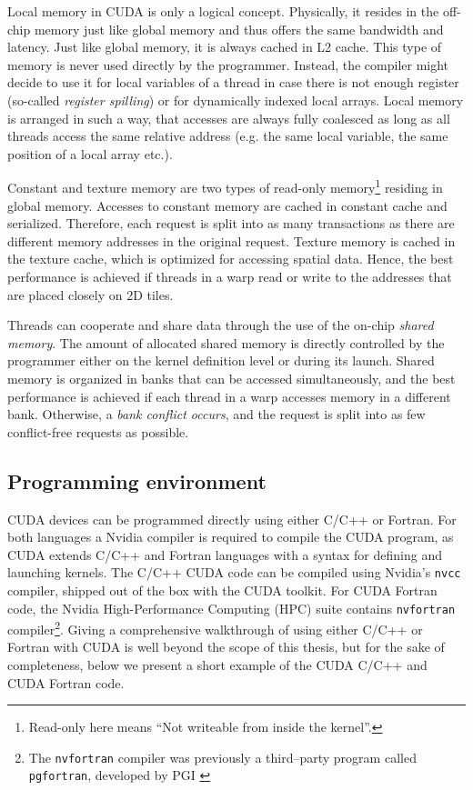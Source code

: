 Local memory in CUDA is only a logical concept. Physically, it resides in the
off-chip memory just like global memory and thus offers the same bandwidth and
latency. Just like global memory, it is always cached in L2 cache. This type of
memory is never used directly by the programmer. Instead, the compiler might
decide to use it for local variables of a thread in case there is not enough
register (so-called \emph{register spilling}) or for dynamically indexed local
arrays. Local memory is arranged in such a way, that accesses are always fully
coalesced as long as all threads access the same relative address (e.g. the
same local variable, the same position of a local array etc.).

Constant and texture memory are two types of read-only
memory\footnote{Read-only here means ``Not writeable from inside the kernel''.}
residing in global memory. Accesses to constant memory are cached in constant
cache and serialized. Therefore, each request is split into as many
transactions as there are different memory addresses in the original request.
Texture memory is cached in the texture cache, which is optimized for accessing
spatial data. Hence, the best performance is achieved if threads in a warp read
or write to the addresses that are placed closely on 2D tiles.

Threads can cooperate and share data through the use of the on-chip
\emph{shared memory}. The amount of allocated shared memory is directly
controlled by the programmer either on the kernel definition level or during
its launch. Shared memory is organized in banks that can be accessed
simultaneously, and the best performance is achieved if each thread in a warp
accesses memory in a different bank. Otherwise, a \emph{bank conflict occurs},
and the request is split into as few conflict-free requests as possible.

\subsection{Programming environment}
CUDA devices can be programmed directly using either C/C++ or Fortran. For both
languages a Nvidia compiler is required to compile the CUDA program, as CUDA
extends C/C++ and Fortran languages with a syntax for defining and launching
kernels. The C/C++ CUDA code can be compiled using Nvidia's \texttt{nvcc}
compiler, shipped out of the box with the CUDA toolkit. For CUDA Fortran code,
the Nvidia High-Performance Computing (HPC) suite contains \texttt{nvfortran}
compiler\footnote{The \texttt{nvfortran} compiler was previously a third--party
  program called \texttt{pgfortran}, developed by PGI \cite{PGI}}. Giving a
comprehensive walkthrough of using either C/C++ or Fortran with CUDA is well
beyond the scope of this thesis, but for the sake of completeness, below we
present a short example of the CUDA C/C++ and CUDA Fortran code.

